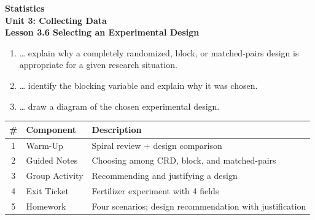 \documentclass[10pt]{article}
\begin{document}
\vspace{-0.8in}

\begin{center}
  {\color{white}\textbf{\LARGE Statistics}}\\[4pt]
  {\color{skymid}\large\textbf{Unit 3: Collecting Data}}\\[6pt]
  {\color{white}\textbf{\large Lesson 3.6 \quad Selecting an Experimental Design}}
\end{center}

\vspace{0.22in}
\namedateperiod
\vspace{0.18in}

\begin{learningtargetbox}
\small
\begin{enumerate}[leftmargin=1.5em, itemsep=5pt]
  \item \ldots{} explain why a completely randomized, block, or matched-pairs design is appropriate for a given research situation.
  \item \ldots{} identify the blocking variable and explain why it was chosen.
  \item \ldots{} draw a diagram of the chosen experimental design.
\end{enumerate}
\end{learningtargetbox}

\vspace{0.14in}

\begin{tocbox}
\small
\renewcommand{\arraystretch}{1.5}
\begin{tabularx}{\linewidth}{@{} c l X @{}}
\rowcolor{sky}
\textbf{\#} & \textbf{Component} & \textbf{Description} \\
\midrule
1 & Warm-Up & Spiral review + design comparison \\
2 & Guided Notes & Choosing among CRD, block, and matched-pairs \\
3 & Group Activity & Recommending and justifying a design \\
4 & Exit Ticket & Fertilizer experiment with 4 fields \\
5 & Homework & Four scenarios; design recommendation with justification \\
\end{tabularx}
\end{tocbox}
\end{document}
